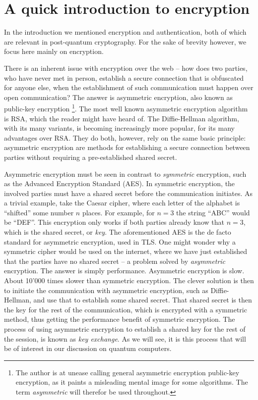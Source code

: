 \documentclass[conference]{IEEEtran}
\begin{document}
\section{A quick introduction to encryption}
In the introduction we mentioned encryption and authentication, both of which are relevant in post-quantum cryptography.
For the sake of brevity however, we focus here mainly on encryption.

There is an inherent issue with encryption over the web -- how does two parties, who have never met in person, establish a secure connection that is obfuscated for anyone else, when the establishment of such communication must happen over open communication?
The answer is asymmetric encryption, also known as public-key encryption
\footnote{The author is at unease calling general asymmetric encryption public-key encryption, as it paints a misleading mental image for some algorithms. The term \emph{asymmetric} will therefor be used throughout.}.
The most well known asymmetric encryption algorithm is RSA, which the reader might have heard of.
The Diffie-Hellman algorithm, with its many variants, is becoming increasingly more popular, for its many advantages over RSA.
They do both, however, rely on the same basic principle: asymmetric encryption are methods for establishing a secure connection between parties without requiring a pre-established shared secret.

Asymmetric encryption must be seen in contrast to \emph{symmetric} encryption, such as the Advanced Encryption Standard (AES).
In symmetric encryption, the involved parties must have a shared secret before the communication initiates.
As a trivial example, take the Caesar cipher, where each letter of the alphabet is ``shifted'' some number $n$ places.
For example, for $n=3$ the string ``ABC'' would be ``DEF''.
This encryption only works if both parties already know that $n=3$, which is the shared secret, or \emph{key}.
The aforementioned AES is the de facto standard for asymmetric encryption, used in TLS.
One might wonder why a symmetric cipher would be used on the internet, where we have just established that the parties have no shared secret -- a problem solved by \emph{asymmetric} encryption.
The answer is simply performance.
Asymmetric encryption is slow.
About 10'000 times slower than symmetric encryption.
The clever solution is then to initiate the communication with asymmetric encryption, such as Diffie-Hellman, and use that to establish some shared secret.
That shared secret is then the key for the rest of the communication, which is encrypted with a symmetric method, thus getting the performance benefit of symmetric encryption.
The process of using asymmetric encryption to establish a shared key for the rest of the session, is known as \emph{key exchange}.
As we will see, it is this process that will be of interest in our discussion on quantum computers.
\end{document}
